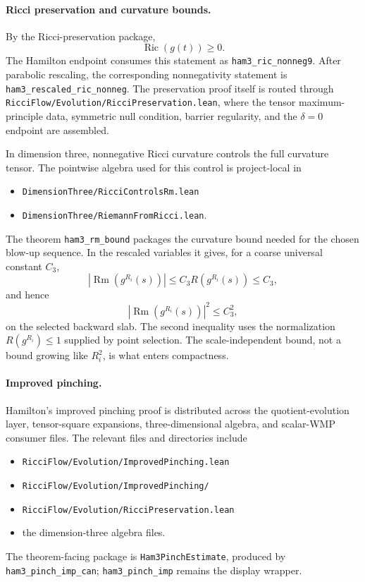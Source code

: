 \documentclass[11pt]{article}
\theoremstyle{plain}
\theoremstyle{definition}
\theoremstyle{remark}
\newcommand{\Ric}{\operatorname{Ric}}
\newcommand{\Rm}{\operatorname{Rm}}
\newcommand{\norm}[1]{\left|#1\right|}
\newcommand{\del}{\delta}
\newcommand{\leanref}[1]{\nolinkurl{#1}}
\newcommand{\leanfile}[1]{\nolinkurl{#1}}
\newcommand{\rffile}[1]{\leanfile{#1}}
\newcommand{\rfdir}[1]{\leanfile{#1/}}
\begin{document}
\paragraph{Ricci preservation and curvature bounds.}
By the Ricci-preservation package,
\[
\Ric(g(t))\ge0.
\]
The Hamilton endpoint consumes this statement as \leanref{ham3_ric_nonneg9}.
After parabolic rescaling, the corresponding nonnegativity statement is
\leanref{ham3_rescaled_ric_nonneg}.  The preservation proof itself is routed
through \rffile{RicciFlow/Evolution/RicciPreservation.lean}, where the tensor
maximum-principle data, symmetric null condition, barrier regularity, and the
\(\del=0\) endpoint are assembled.

In dimension three, nonnegative Ricci curvature controls the full curvature
tensor.  The pointwise algebra used for this control is project-local in
\begin{itemize}[leftmargin=2em]
  \item \rffile{DimensionThree/RicciControlsRm.lean}
  \item \rffile{DimensionThree/RiemannFromRicci.lean}.
\end{itemize}
The theorem \leanref{ham3_rm_bound} packages the curvature bound needed for the
chosen blow-up sequence.  In the rescaled variables it gives, for a coarse
universal constant \(C_3\),
\[
\norm{\Rm(g^{R_i}(s))} \le C_3 R(g^{R_i}(s))\le C_3,
\]
and hence
\[
\norm{\Rm(g^{R_i}(s))}^2\le C_3^2,
\]
on the selected backward slab.  The second inequality uses the normalization
\(R(g^{R_i})\le1\) supplied by point selection.  The scale-independent bound,
not a bound growing like $R_i^2$, is what enters compactness.

\paragraph{Improved pinching.}
Hamilton's improved pinching proof is distributed across the quotient-evolution
layer, tensor-square expansions, three-dimensional algebra, and scalar-WMP
consumer files.  The relevant files and directories include
\begin{itemize}[leftmargin=2em]
  \item \rffile{RicciFlow/Evolution/ImprovedPinching.lean}
  \item \rfdir{RicciFlow/Evolution/ImprovedPinching}
  \item \rffile{RicciFlow/Evolution/RicciPreservation.lean}
  \item the dimension-three algebra files.
\end{itemize}
The theorem-facing package is \leanref{Ham3PinchEstimate}, produced by
\leanref{ham3_pinch_imp_can}; \leanref{ham3_pinch_imp} remains the display
wrapper.
\end{document}
